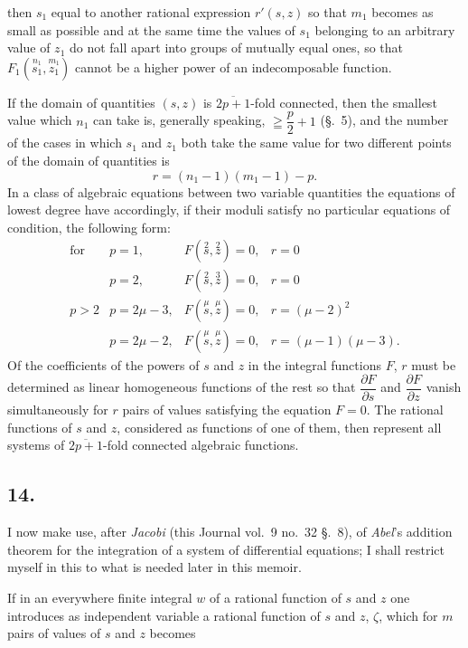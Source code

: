\documentclass{article}
\begin{document}
then $s_{1}$ equal to another rational expression $r'(s, z)$ so that $m_{1}$ becomes as small as possible and at the same time the values of $s_{1}$ belonging to an arbitrary value of $z_{1}$ do not fall apart into groups of mutually equal ones, so that $F_{1}(\overset{n_{1}}{s_{1}}, \overset{m_{1}}{z_{1}})$ cannot be a higher power of an indecomposable function.

If the domain of quantities $(s, z)$ is $\overline{2p+1}$-fold connected, then the smallest value which $n_{1}$ can take is, generally speaking, $\geqq \dfrac{p}{2} + 1$ (§.~5), and the number of the cases in which $s_{1}$ and $z_{1}$ both take the same value for two different points of the domain of quantities is
\[ r = (n_{1}-1)(m_{1}-1) - p. \]
In a class of algebraic equations between two variable quantities the equations of lowest degree have accordingly, if their moduli satisfy no particular equations of condition, the following form:
\[
\begin{array}{llll}
\text{for} & p = 1, & F(\overset{2}{s}, \overset{2}{z}) = 0, & r = 0 \\
 & p = 2, & F(\overset{2}{s}, \overset{3}{z}) = 0, & r = 0 \\
p > 2 & p = 2\mu-3, & F(\overset{\mu}{s}, \overset{\mu}{z}) = 0, & r = (\mu-2)^{2} \\
 & p = 2\mu-2, & F(\overset{\mu}{s}, \overset{\mu}{z}) = 0, & r = (\mu-1)(\mu-3).
\end{array}
\]
Of the coefficients of the powers of $s$ and $z$ in the integral functions $F$, $r$ must be determined as linear homogeneous functions of the rest so that $\dfrac{\partial F}{\partial s}$ and $\dfrac{\partial F}{\partial z}$ vanish simultaneously for $r$ pairs of values satisfying the equation $F = 0$. The rational functions of $s$ and $z$, considered as functions of one of them, then represent all systems of $\overline{2p+1}$-fold connected algebraic functions.

\subsection*{14.}

I now make use, after \emph{Jacobi} (this Journal vol.~9 no.~32 §.~8), of \emph{Abel}'s addition theorem for the integration of a system of differential equations; I shall restrict myself in this to what is needed later in this memoir.

If in an everywhere finite integral $w$ of a rational function of $s$ and $z$ one introduces as independent variable a rational function of $s$ and $z$, $\zeta$, which for $m$ pairs of values of $s$ and $z$ becomes
\end{document}
